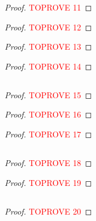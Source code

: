 \documentclass[letterpaper]{article}
\begin{document}
\formoflovaszextension*
\begin{proof}\textcolor{red}{TOPROVE 11}\end{proof}

\formoflovaszextensionsym
\begin{proof}\textcolor{red}{TOPROVE 12}\end{proof}


\flowembedding*
\begin{proof}\textcolor{red}{TOPROVE 13}\end{proof}

\flowdecomposition*
\begin{proof}\textcolor{red}{TOPROVE 14}\end{proof}
 
\subsection{}
\label{sec.appendix.omitted.sdp-algorithm}
\symrelaxation*
\begin{proof}\textcolor{red}{TOPROVE 15}\end{proof}

\genrelaxation*
\begin{proof}\textcolor{red}{TOPROVE 16}\end{proof}

\directedembedding*
\begin{proof}\textcolor{red}{TOPROVE 17}\end{proof}
 
\subsection{}
\label{sec.appendix.omitted.ci}
\improveduality*
\begin{proof}\textcolor{red}{TOPROVE 18}\end{proof}

\dualgraphcertificate*
\begin{proof}\textcolor{red}{TOPROVE 19}\end{proof}
 
\subsection{}
\label{sec.appendix.omitted.alg-cm}
\genpoly*

\polycut*

\begin{proof}\textcolor{red}{TOPROVE 20}\end{proof}
\end{document}
